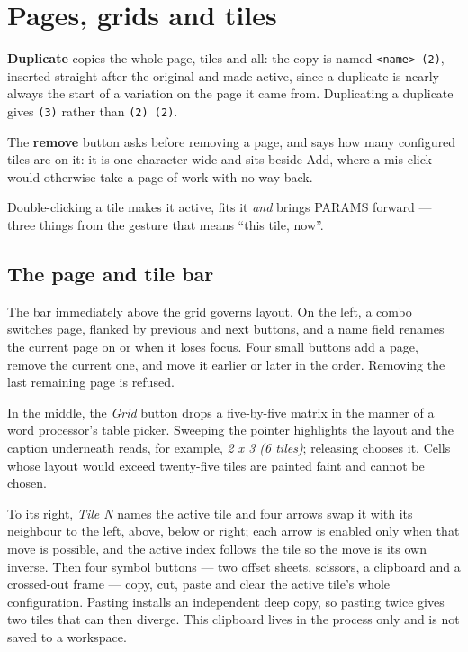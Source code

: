 \documentclass[11pt,a4paper,oneside]{report}
\newcommand{\code}[1]{\texttt{#1}}
\newcommand{\key}[1]{\textsf{\small\fbox{#1}}}
\begin{document}
\chapter{Pages, grids and tiles}

\textbf{Duplicate} copies the whole page, tiles and all: the copy is named
\code{<name> (2)}, inserted straight after the original and made active, since a
duplicate is nearly always the start of a variation on the page it came from.
Duplicating a duplicate gives \code{(3)} rather than \code{(2) (2)}.

The \textbf{remove} button asks before removing a page, and says how many
configured tiles are on it: it is one character wide and sits beside Add, where
a mis-click would otherwise take a page of work with no way back.

Double-clicking a tile makes it active, fits it \emph{and} brings PARAMS
forward --- three things from the gesture that means ``this tile, now''.
\label{ch:pages}

\section{The page and tile bar}

The bar immediately above the grid governs layout. On the left, a combo switches
page, flanked by previous and next buttons, and a name field renames the current
page on \key{Enter} or when it loses focus. Four small buttons add a page,
remove the current one, and move it earlier or later in the order. Removing the
last remaining page is refused.

In the middle, the \emph{Grid} button drops a five-by-five matrix in the manner
of a word processor's table picker. Sweeping the pointer highlights the layout
and the caption underneath reads, for example, \emph{2 x 3 (6 tiles)}; releasing
chooses it. Cells whose layout would exceed twenty-five tiles are painted faint
and cannot be chosen.

To its right, \emph{Tile N} names the active tile and four arrows swap it with
its neighbour to the left, above, below or right; each arrow is enabled only when
that move is possible, and the active index follows the tile so the move is its
own inverse. Then four symbol buttons --- two offset sheets, scissors, a
clipboard and a crossed-out frame --- copy, cut, paste and clear the active
tile's whole configuration. Pasting installs an independent deep copy, so
pasting twice gives two tiles that can then diverge. This clipboard lives in
the process only and is not saved to a workspace.
\end{document}
